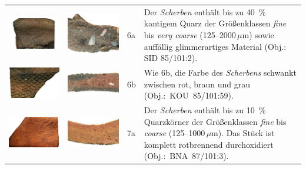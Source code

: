 \begin{footnotesize}
{\begin{longtable}{@{}m{}m{}m{}m{}@{}}
\includegraphics[width=.3\textwidth]{tbl/Tab_Fabrics/SID85-101-2_5cm.jpg} & \includegraphics[width=.3\textwidth]{tbl/Tab_Fabrics/SID85-101-2_2cm.jpg} & 6a & Der \textit{Scherben} enthält bis zu 40~\% kantigem Quarz der Größenklassen \textit{fine} bis \textit{very coarse} (125--2000\,$\mu$m) sowie auffällig glimmerartiges Material (Obj.: SID 85/101:2). \\
\includegraphics[width=.3\textwidth]{tbl/Tab_Fabrics/KOU85-101-59_5cm.jpg} & \includegraphics[width=.3\textwidth]{tbl/Tab_Fabrics/KOU85-101-59_2cm.jpg} & 6b & Wie 6b, die Farbe des \textit{Scherbens} schwankt zwischen rot, braun und grau (Obj.:~KOU~85/101:59). \\
\includegraphics[width=.3\textwidth]{tbl/Tab_Fabrics/BNA87-101-3_5cm.jpg} & \includegraphics[width=.3\textwidth]{tbl/Tab_Fabrics/BNA87-101-3_2cm.jpg} & 7a & Der \textit{Scherben} enthält bis zu 10~\% Quarzkörner der Größenklassen \textit{fine} bis \textit{coarse} (125--1000\,$\mu$m). Das Stück ist komplett rotbrennend durchoxidiert (Obj.:~BNA~87/101:3).\vspace{1em} \\

\end{longtable}}
\end{footnotesize}
